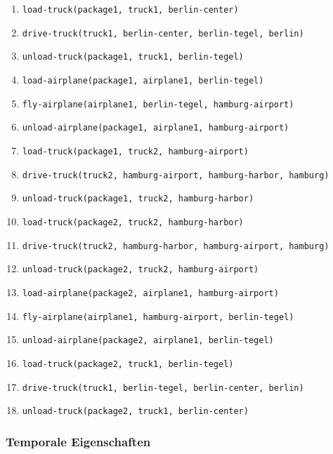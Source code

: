 ﻿\documentclass[a4paper,12pt]{article}
\theoremstyle{definition}
\begin{document}
\begin{enumerate}
	\item \texttt{load-truck(package1, truck1, berlin-center)}
	\item \texttt{drive-truck(truck1, berlin-center, berlin-tegel, berlin)}
	\item \texttt{unload-truck(package1, truck1, berlin-tegel)}
	\item \texttt{load-airplane(package1, airplane1, berlin-tegel)}
	\item \texttt{fly-airplane(airplane1, berlin-tegel, hamburg-airport)}
	\item \texttt{unload-airplane(package1, airplane1, hamburg-airport)}
	\item \texttt{load-truck(package1, truck2, hamburg-airport)}
	\item \texttt{drive-truck(truck2, hamburg-airport, hamburg-harbor, hamburg)}
	\item \texttt{unload-truck(package1, truck2, hamburg-harbor)}
	\item \texttt{load-truck(package2, truck2, hamburg-harbor)}
	\item \texttt{drive-truck(truck2, hamburg-harbor, hamburg-airport, hamburg)}
	\item \texttt{unload-truck(package2, truck2, hamburg-airport)}
	\item \texttt{load-airplane(package2, airplane1, hamburg-airport)}
	\item \texttt{fly-airplane(airplane1, hamburg-airport, berlin-tegel)}
	\item \texttt{unload-airplane(package2, airplane1, berlin-tegel)}
	\item \texttt{load-truck(package2, truck1, berlin-tegel)}
	\item \texttt{drive-truck(truck1, berlin-tegel, berlin-center, berlin)}
	\item \texttt{unload-truck(package2, truck1, berlin-center)}
\end{enumerate}

\subsubsection{Temporale Eigenschaften}
\end{document}
